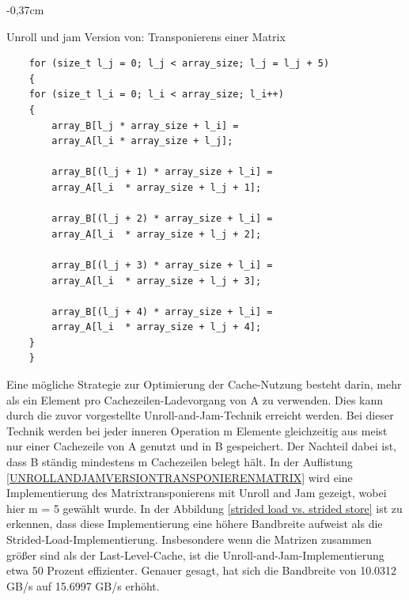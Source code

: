 \documentclass[sigconf,language=ngerman]{acmart}
\begin{document}
\begin{tiny}
    \begin{adjustwidth}{-0,37cm}{}
    \begin{footnotesize}
    \begin{auflistung}
    \caption{Unroll und jam Version von: Transponierens einer Matrix}
    \label{UNROLLANDJAMVERSIONTRANSPONIERENMATRIX}
    \begin{verbatim}
    for (size_t l_j = 0; l_j < array_size; l_j = l_j + 5)
    {
    for (size_t l_i = 0; l_i < array_size; l_i++)
    {
        array_B[l_j * array_size + l_i] = 
        array_A[l_i * array_size + l_j];

        array_B[(l_j + 1) * array_size + l_i] = 
        array_A[l_i  * array_size + l_j + 1];

        array_B[(l_j + 2) * array_size + l_i] = 
        array_A[l_i  * array_size + l_j + 2];

        array_B[(l_j + 3) * array_size + l_i] = 
        array_A[l_i  * array_size + l_j + 3];
        
        array_B[(l_j + 4) * array_size + l_i] = 
        array_A[l_i  * array_size + l_j + 4];
    }
    }
    \end{verbatim}
    \end{auflistung}
    \end{footnotesize}
    \end{adjustwidth}
    \end{tiny}



Eine mögliche Strategie zur Optimierung der Cache-Nutzung besteht darin, 
mehr als ein Element pro Cachezeilen-Ladevorgang von A zu verwenden. 
Dies kann durch die zuvor vorgestellte Unroll-and-Jam-Technik erreicht werden. 
Bei dieser Technik werden bei jeder inneren Operation m Elemente gleichzeitig 
aus meist nur einer Cachezeile von A genutzt und in B gespeichert. 
Der Nachteil dabei ist, dass B ständig mindestens m Cachezeilen belegt hält. 
In der Auflistung \ref{UNROLLANDJAMVERSIONTRANSPONIERENMATRIX} wird eine 
Implementierung des Matrixtransponierens mit Unroll and Jam gezeigt, 
wobei hier m = 5 gewählt wurde. 
In der Abbildung \ref{strided load vs. strided store} ist zu erkennen, 
dass diese Implementierung eine höhere Bandbreite aufweist als die Strided-Load-Implementierung. 
Insbesondere wenn die Matrizen zusammen größer sind als der Last-Level-Cache, 
ist die Unroll-and-Jam-Implementierung etwa 50 Prozent effizienter. 
Genauer gesagt, hat sich die Bandbreite von 10.0312 GB/s auf 15.6997 GB/s erhöht.
\end{document}
